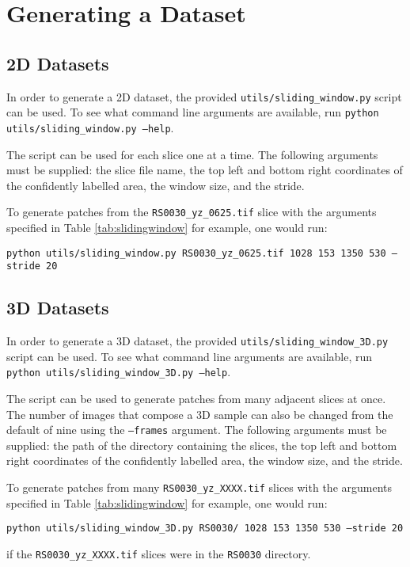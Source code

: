 \section{Generating a Dataset}

\subsection{2D Datasets}

In order to generate a 2D dataset, the provided \texttt{utils/sliding\_window.py} script can be used. To see what command line arguments are available, run \texttt{python utils/sliding\_window.py --help}.

The script can be used for each slice one at a time. The following arguments must be supplied: the slice file name, the top left and bottom right coordinates of the confidently labelled area, the window size, and the stride.

To generate patches from the \texttt{RS0030\_yz\_0625.tif} slice with the arguments specified in Table \ref{tab:slidingwindow} for example, one would run:

\texttt{python utils/sliding\_window.py RS0030\_yz\_0625.tif 1028 153 1350 530 --stride 20}

\subsection{3D Datasets}

In order to generate a 3D dataset, the provided \texttt{utils/sliding\_window\_3D.py} script can be used. To see what command line arguments are available, run \texttt{python utils/sliding\_window\_3D.py --help}.

The script can be used to generate patches from many adjacent slices at once. The number of images that compose a 3D sample can also be changed from the default of nine using the \texttt{--frames} argument. The following arguments must be supplied: the path of the directory containing the slices, the top left and bottom right coordinates of the confidently labelled area, the window size, and the stride.

To generate patches from many \texttt{RS0030\_yz\_XXXX.tif} slices with the arguments specified in Table \ref{tab:slidingwindow} for example, one would run:

\texttt{python utils/sliding\_window\_3D.py RS0030/ 1028 153 1350 530 --stride 20}

if the \texttt{RS0030\_yz\_XXXX.tif} slices were in the \texttt{RS0030} directory.

